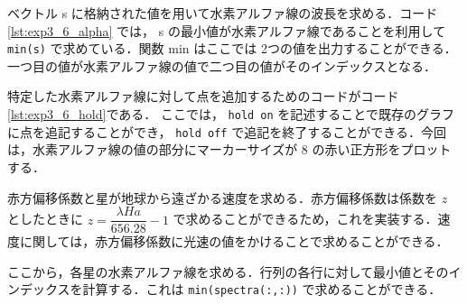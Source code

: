     ベクトル s に格納された値を用いて水素アルファ線の波長を求める．コード \ref{lst:exp3_6_alpha} では， s の最小値が水素アルファ線であることを利用して \lstinline|min(s)| で求めている．関数 min はここでは 2つの値を出力することができる．一つ目の値が水素アルファ線の値で二つ目の値がそのインデックスとなる．

    

    特定した水素アルファ線に対して点を追加するためのコードがコード\ref{lst:exp3_6_hold}である． ここでは， \lstinline|hold on| を記述することで既存のグラフに点を追記することができ， \lstinline|hold off| で追記を終了することができる．今回は，水素アルファ線の値の部分にマーカーサイズが 8 の赤い正方形をプロットする．
    
    
    赤方偏移係数と星が地球から遠ざかる速度を求める．赤方偏移係数は係数を $z$ としたときに $z = \dfrac{\lambda Ha }{656.28} - 1$ で求めることができるため，これを実装する．速度に関しては，赤方偏移係数に光速の値をかけることで求めることができる．
    

    ここから，各星の水素アルファ線を求める．行列の各行に対して最小値とそのインデックスを計算する．これは \lstinline|min(spectra(:,:))| で求めることができる．

